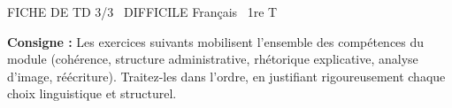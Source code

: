 \documentclass[11pt]{article}
\begin{document}
\begin{tcolorbox}[enhanced,colback=popink,colframe=popink,arc=10pt,boxrule=0pt,left=12pt,right=12pt,top=9pt,bottom=9pt]
{\color{white}\popxbold\small FICHE DE TD 3/3 \textbullet\ DIFFICILE \hfill Français \textbullet\ 1re T\par}
\end{tcolorbox}
\vspace{4pt}
\noindent\textbf{Consigne :} Les exercices suivants mobilisent l'ensemble des compétences du module (cohérence, structure administrative, rhétorique explicative, analyse d'image, réécriture). Traitez-les dans l'ordre, en justifiant rigoureusement chaque choix linguistique et structurel.
\end{document}
